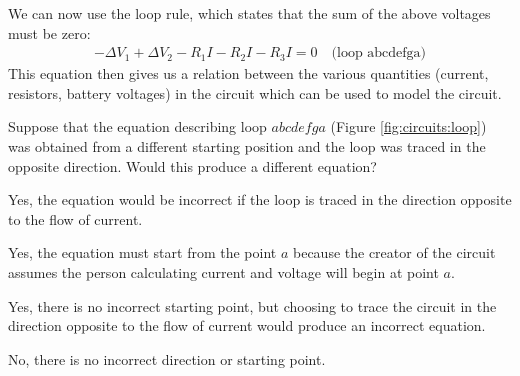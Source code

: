 We can now use the loop rule, which states that the sum of the above voltages must be zero:
\begin{align*}
-\Delta V_1 + \Delta V_2 - R_1I - R_2I - R_3I = 0\quad \text{(loop abcdefga)}
\end{align*}
This equation then gives us a relation between the various quantities (current, resistors, battery voltages) in the circuit which can be used to model the circuit.  

\begin{checkpoint}{}
	\begin{MCquestion}{Suppose that the equation describing loop $abcdefga$ (Figure \ref{fig:circuits:loop}) was obtained from a different starting position and the loop was traced in the opposite direction. Would this produce a different equation?}
		\item Yes, the equation would be incorrect if the loop is traced in the direction opposite to the flow of current.
		\item Yes, the equation must start from the point $a$ because the creator of the circuit assumes the person calculating current and voltage will begin at point $a$.
		\item Yes, there is no incorrect starting point, but choosing to trace the circuit in the direction opposite to the flow of current would produce an incorrect equation.
		\item No, there is no incorrect direction or starting point. \correct
	\end{MCquestion}
\end{checkpoint}
\newpage
